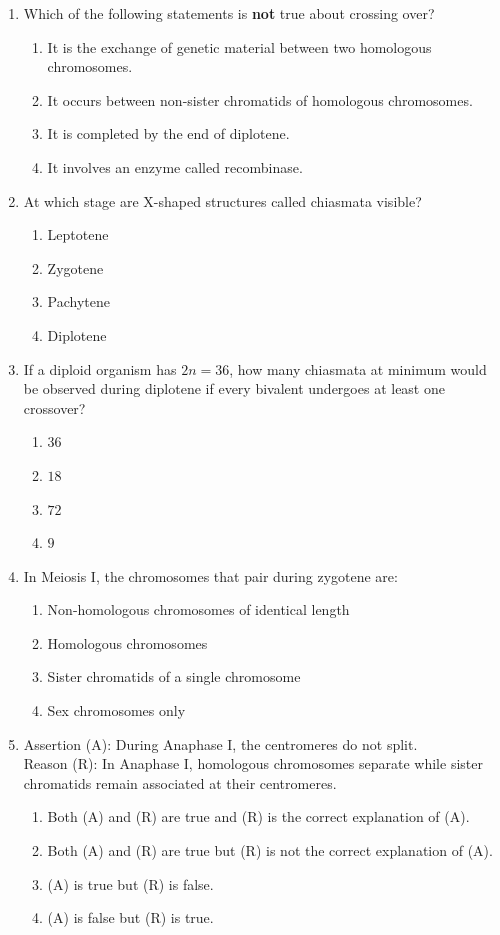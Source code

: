 \documentclass[11pt,a4paper]{article}
\begin{document}
\begin{enumerate}[label=\textbf{\arabic*.}]
\item Which of the following statements is \textbf{not} true about crossing over?
\begin{enumerate}[label=(\Alph*)]
    \item It is the exchange of genetic material between two homologous chromosomes.
    \item It occurs between non-sister chromatids of homologous chromosomes.
    \item It is completed by the end of diplotene.
    \item It involves an enzyme called recombinase.
\end{enumerate}

\item At which stage are X-shaped structures called chiasmata visible?
\begin{enumerate}[label=(\Alph*)]
    \item Leptotene
    \item Zygotene
    \item Pachytene
    \item Diplotene
\end{enumerate}

\item If a diploid organism has $2n = 36$, how many chiasmata at minimum would be observed during diplotene if every bivalent undergoes at least one crossover?
\begin{enumerate}[label=(\Alph*)]
    \item $36$
    \item $18$
    \item $72$
    \item $9$
\end{enumerate}

\item In Meiosis I, the chromosomes that pair during zygotene are:
\begin{enumerate}[label=(\Alph*)]
    \item Non-homologous chromosomes of identical length
    \item Homologous chromosomes
    \item Sister chromatids of a single chromosome
    \item Sex chromosomes only
\end{enumerate}

\item Assertion (A): During Anaphase I, the centromeres do not split.\\
Reason (R): In Anaphase I, homologous chromosomes separate while sister chromatids remain associated at their centromeres.
\begin{enumerate}[label=(\Alph*)]
    \item Both (A) and (R) are true and (R) is the correct explanation of (A).
    \item Both (A) and (R) are true but (R) is not the correct explanation of (A).
    \item (A) is true but (R) is false.
    \item (A) is false but (R) is true.
\end{enumerate}


\end{enumerate}
\end{document}
